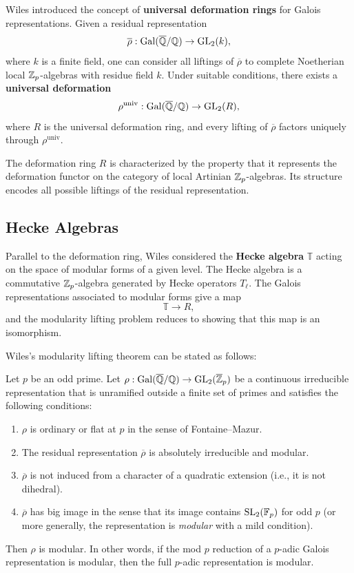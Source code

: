 Wiles introduced the concept of \textbf{universal deformation rings} for Galois representations. Given a residual representation
\[
\overline{\rho}: \operatorname{Gal}(\overline{\mathbb{Q}}/\mathbb{Q}) \to \operatorname{GL}_2(k),
\]
where \(k\) is a finite field, one can consider all liftings of \(\overline{\rho}\) to complete Noetherian local \(\mathbb{Z}_p\)-algebras with residue field \(k\). Under suitable conditions, there exists a \textbf{universal deformation}
\[
\rho^{\text{univ}}: \operatorname{Gal}(\overline{\mathbb{Q}}/\mathbb{Q}) \to \operatorname{GL}_2(R),
\]
where \(R\) is the universal deformation ring, and every lifting of \(\overline{\rho}\) factors uniquely through \(\rho^{\text{univ}}\).

The deformation ring \(R\) is characterized by the property that it represents the deformation functor on the category of local Artinian \(\mathbb{Z}_p\)-algebras. Its structure encodes all possible liftings of the residual representation.

\subsection{Hecke Algebras}

Parallel to the deformation ring, Wiles considered the \textbf{Hecke algebra} \(\mathbb{T}\) acting on the space of modular forms of a given level. The Hecke algebra is a commutative \(\mathbb{Z}_p\)-algebra generated by Hecke operators \(T_\ell\). The Galois representations associated to modular forms give a map
\[
\mathbb{T} \to R,
\]
and the modularity lifting problem reduces to showing that this map is an isomorphism.

Wiles's modularity lifting theorem can be stated as follows:

\begin{theorem}
Let \(p\) be an odd prime. Let \(\rho: \operatorname{Gal}(\overline{\mathbb{Q}}/\mathbb{Q}) \to \operatorname{GL}_2(\overline{\mathbb{Z}}_p)\) be a continuous irreducible representation that is unramified outside a finite set of primes and satisfies the following conditions:
\begin{enumerate}
    \item \(\rho\) is ordinary or flat at \(p\) in the sense of Fontaine--Mazur.
    \item The residual representation \(\overline{\rho}\) is absolutely irreducible and modular.
    \item \(\overline{\rho}\) is not induced from a character of a quadratic extension (i.e., it is not dihedral).
    \item \(\overline{\rho}\) has big image in the sense that its image contains \(\operatorname{SL}_2(\mathbb{F}_p)\) for odd \(p\) (or more generally, the representation is \textit{modular} with a mild condition).
\end{enumerate}
Then \(\rho\) is modular. In other words, if the mod \(p\) reduction of a \(p\)-adic Galois representation is modular, then the full \(p\)-adic representation is modular.
\end{theorem}

